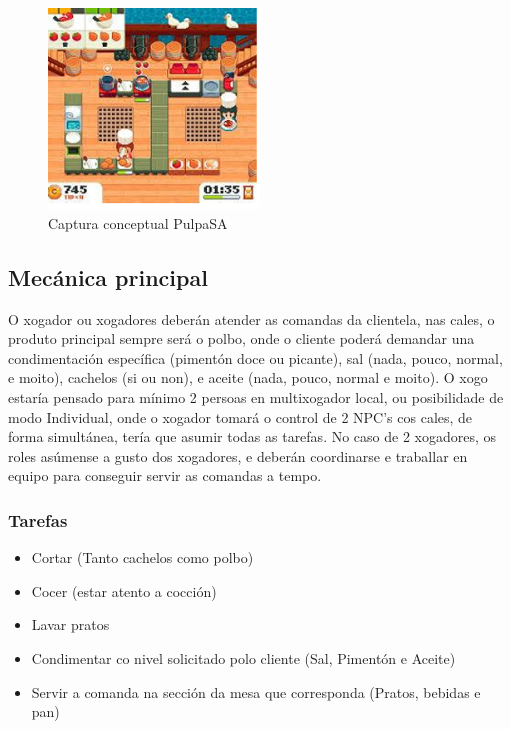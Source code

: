 \documentclass{report}  %
\begin{document}
\begin{figure}[h]
    \centering
    \includegraphics[width=0.5\textwidth]{images/concept_game.png}
    \caption{Captura conceptual PulpaSA}
    \label{fig:Captura conceptual PulpaSA}
\end{figure}

\newpage

\subsection{Mecánica principal}
O xogador ou xogadores deberán atender as comandas da clientela, nas cales, 
o produto principal sempre será o polbo, onde o cliente poderá demandar una 
condimentación específica (pimentón doce ou picante), sal (nada, pouco, 
normal, e moito), cachelos (si ou non), e aceite (nada, pouco, normal e moito). 
O xogo estaría pensado para mínimo 2 persoas en multixogador local, ou 
posibilidade de modo Individual, onde o xogador tomará o control de 2 NPC’s 
cos cales, de forma simultánea, tería que asumir todas as tarefas. No caso de 
2 xogadores, os roles asúmense a gusto dos xogadores, e deberán 
coordinarse e traballar en equipo para conseguir servir as comandas a tempo. 

\subsubsection{Tarefas}
\begin{itemize}
    \item Cortar (Tanto cachelos como polbo)
    \item Cocer (estar atento a cocción)
    \item Lavar pratos
    \item Condimentar co nivel solicitado polo cliente (Sal, Pimentón e Aceite)
    \item Servir a comanda na sección da mesa que corresponda (Pratos, bebidas
    e pan)
\end{itemize}
\end{document}
